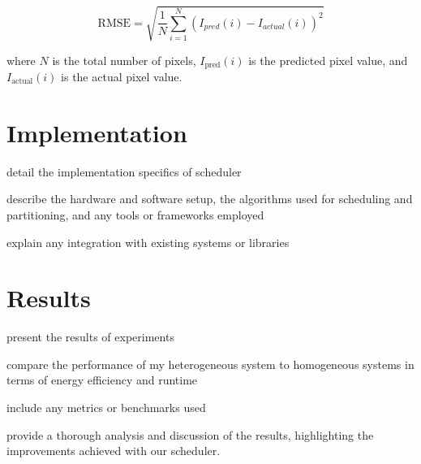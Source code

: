 \documentclass[]{spie}  %
\begin{document}
\begin{equation}\label{RSME}
\text{RMSE} = \sqrt{\frac{1}{N} \sum_{i=1}^{N} (I_{pred}(i) - I_{actual}(i))^2}
\end{equation}

where \( N \) is the total number of pixels, \( I_{\text{pred}}(i) \) is the predicted pixel value, and \( I_{\text{actual}}(i) \) is the actual pixel value.



\section{Implementation}
\label{sec:implementation}
detail the implementation specifics of scheduler

describe the hardware and software setup, the algorithms used for scheduling and partitioning, and any tools or frameworks employed

explain any integration with existing systems or libraries

\section{Results}
\label{sec:evaluation}
present the results of experiments

compare the performance of my heterogeneous system to homogeneous systems in terms of energy efficiency and runtime

include any metrics or benchmarks used 

provide a thorough analysis and discussion of the results, highlighting the improvements achieved with our scheduler.
\end{document}
